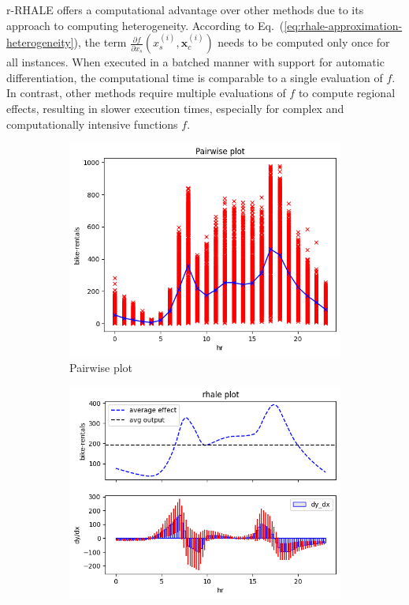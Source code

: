 \documentclass[
twocolumn,
]{ceurart}
\newcommand{\xci}{\mathbf{x}^{(i)}_c}
\begin{document}
r-RHALE offers a computational advantage over other methods due to its approach to computing heterogeneity. According to Eq.~(\ref{eq:rhale-approximation-heterogeneity}), the term \( \frac{\partial f}{\partial x_s} (x_s^{(i)}, \xci) \) needs to be computed only once for all instances. When executed in a batched manner with support for automatic differentiation, the computational time is comparable to a single evaluation of \( f \). In contrast, other methods require multiple evaluations of \( f \) to compute regional effects, resulting in slower execution times, especially for complex and computationally intensive functions \( f \).


\begin{figure}
  \centering
  \begin{subfigure}[t]{0.24\textwidth}
  \centering
  \includegraphics[width=\linewidth]{figures/running_example/01_bike_sharing_dataset_pairwise_plot.png}
  \caption{Pairwise plot}
  \label{subfig:pairwise}
  \end{subfigure}
  \begin{subfigure}[t]{0.24\textwidth}
  \centering
  \includegraphics[width=\linewidth]{figures/running_example/01_bike_sharing_dataset_23_1.png}

\end{subfigure}
\end{figure}
\end{document}
